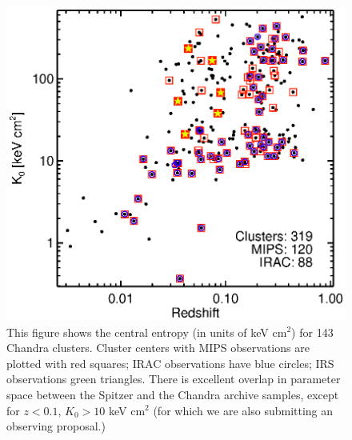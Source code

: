 \documentclass[letterpaper,12pt]{article}
\begin{document}
\clearpage
\begin{figure}[t]
    \begin{minipage}[t]{0.5\linewidth}
        \centering
        \includegraphics*[width=\textwidth, trim=28mm 10mm 30mm 17mm, clip]{spitzer_k0}
        \caption{\small This figure shows the central entropy (in units of keV cm$^2$) for 143
        Chandra clusters. Cluster centers with MIPS observations are
        plotted with red squares; IRAC observations have blue circles; IRS
        observations green triangles. There is excellent overlap in parameter
        space between the Spitzer and the Chandra archive samples, except for
        $z<0.1$, $K_0>10$ keV cm$^2$ (for which we are also submitting an
        observing proposal.)} 
        \label{fig:figure1}
    \end{minipage}
    \hspace{0.25cm}
    \begin{minipage}[t]{0.5\linewidth}
        \centering

\end{minipage}
\end{figure}
\end{document}
